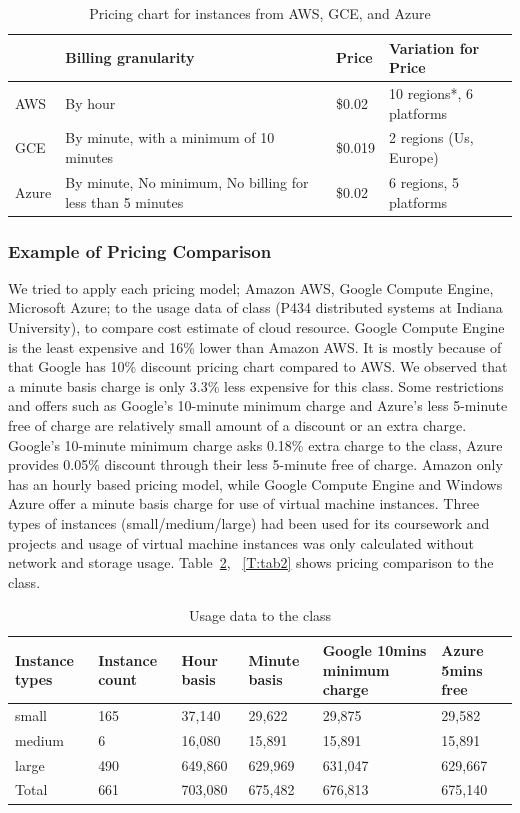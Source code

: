 \documentclass{sig-alternate}
\begin{document}
\begin{table}[h!]
\caption{Pricing chart for instances from AWS, GCE, and Azure}\label{T:tab0}
\begin{tabular}{l|l|l|l}
     &	Billing granularity &	Price &	Variation for Price \\
  \hline
AWS &	By hour	& \$0.02 &	10 regions*, 6 platforms \\
GCE &	By minute, with a minimum of 10 minutes &	\$0.019  &	2 regions (Us, Europe) \\
Azure &	By minute, No minimum, No billing for less than 5 minutes & \$0.02 &	6 regions, 5 platforms \\
\end{tabular}
\end{table}

\subsubsection{Example of Pricing Comparison}

We tried to apply each pricing model; Amazon AWS, Google Compute Engine, Microsoft Azure; to the usage data of class (P434 distributed systems at Indiana University), to compare cost estimate of cloud resource. Google Compute Engine is the least expensive and 16\% lower than Amazon AWS. It is mostly because of that Google has 10\% discount pricing chart compared to AWS. We observed that a minute basis charge is only 3.3\% less expensive for this class. Some restrictions and offers such as Google's 10-minute minimum charge and Azure's less 5-minute free of charge are relatively small amount of a discount or an extra charge. Google's 10-minute minimum charge asks 0.18\% extra charge to the class, Azure provides 0.05\% discount through their less 5-minute free of charge. Amazon only has an hourly based pricing model, while Google Compute Engine and Windows Azure offer a minute basis charge for use of virtual machine instances. Three types of instances (small/medium/large) had been used for its coursework and projects and usage of virtual machine instances was only calculated without network and storage usage. Table~\ref{T:tab1}, ~\ref{T:tab2} shows pricing comparison to the class.

\begin{table}[h!]
\caption{Usage data to the class}\label{T:tab1}
\begin{tabular}{l|l|l|l|l|l}
Instance types & Instance count & Hour basis & Minute basis & Google 10mins minimum charge & Azure 5mins free \\
  \hline
small & 165 & 37,140 & 29,622 & 29,875 &29,582 \\
medium & 6 & 16,080 & 15,891 & 15,891 & 15,891 \\
large & 490 & 649,860 & 629,969 & 631,047 & 629,667 \\
  \hline \hline
Total & 661 & 703,080 & 675,482 & 676,813 & 675,140 \\
\end{tabular}
\end{table}
\end{document}
